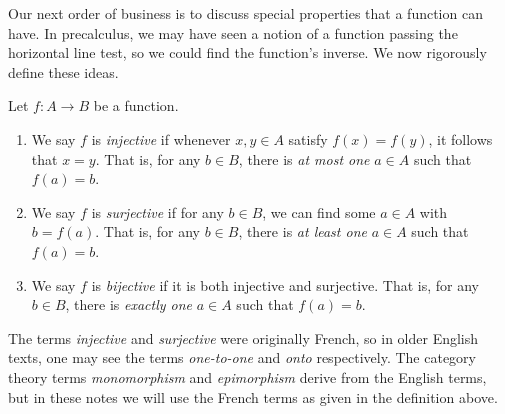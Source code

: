 \documentclass{article}
\begin{document}
Our next order of business is to discuss special properties that a function can have. In precalculus, we may have seen a notion of a function passing the horizontal line test, so we could find the function's inverse. We now rigorously define these ideas.

\begin{definition}
Let $f: A\to B$ be a function.
\begin{enumerate}
    \item We say $f$ is \textit{injective} if whenever $x,y\in A$ satisfy $f(x) = f(y)$, it follows that $x=y$. That is, for any $b\in B$, there is \textit{at most one} $a\in A$ such that $f(a) = b$. 
    \item We say $f$ is \textit{surjective} if for any $b\in B$, we can find some $a\in A$ with $b = f(a)$. That is, for any $b\in B$, there is \textit{at least one} $a\in A$ such that $f(a) = b$.
    \item We say $f$ is \textit{bijective} if it is both injective and surjective. That is, for any $b\in B$, there is \textit{exactly one} $a\in A$ such that $f(a) = b$.
\end{enumerate}
\end{definition}
The terms \textit{injective} and \textit{surjective} were originally French, so in older English texts, one may see the terms \textit{one-to-one} and \textit{onto} respectively. The category theory terms \textit{monomorphism} and \textit{epimorphism} derive from the English terms, but in these notes we will use the French terms as given in the definition above.
\end{document}
